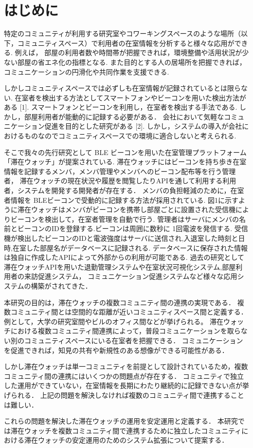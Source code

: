 \thispagestyle{myheadings}

\section{はじめに}
\label{sec:intro}
特定のコミュニティが利用する研究室やコワーキングスペースのような場所（以下，コミュニティスペース）で利用者の在室情報を分析すると様々な応用ができる.
例えば， 部屋の利用者数や時間帯が把握できれば，環境整備や活用状況が少ない部屋の省エネ化の指標となる.
また目的とする人の居場所を把握できれば，コミュニケーションの円滑化や共同作業を支援できる.

しかしコミュニティスペースでは必ずしも在室情報が記録されているとは限らない.
在室者を検出する方法としてスマートフォンやビーコンを用いた検出方法がある [1].
スマートフォンとビーコンを利用し，在室者を検出する手法である.
しかし，部屋利用者が能動的に記録する必要がある．
会社において気軽なコミュニケーション促進を目的とした研究がある [2].
しかし，システムの導入が会社におけるものなのでコミュニティスペースでの環境に適合しないと考えられる.

そこで我々の先行研究として BLE ビーコンを用いた在室管理プラットフォーム「滞在ウォッチ」が提案されている.
滞在ウォッチにはビーコンを持ち歩き在室情報を記録するメンバ，メンバ管理やメンバへのビーコン配布等を行う管理者，
滞在ウォッチの現在状況や履歴を閲覧したりAPIを通して利用する利用者，システムを開発する開発者が存在する．
メンバの負担軽減のために，在室者情報を BLEビーコンで受動的に記録する方法が採用されている.
図1に示すように滞在ウォッチはメンバがビーコンを携帯し部屋ごとに設置された受信機によりビーコンを検出して，在室者管理を自動で行う.
管理者はサーバにメンバの名前とビーコンのIDを登録する.ビーコンは周囲に数秒に 1回電波を発信する.
受信機が検出したビーコンのIDと電波強度はサーバに送信され,入退室した時刻と日時,在室した部屋名がデータベースに記録される.
データベースに保存された情報は独自に作成したAPIによって外部からの利用が可能である.
過去の研究として滞在ウォッチAPIを用いた退勤管理システムや在室状況可視化システム,部屋利用者の来訪促進システム，
コミュニケーション促進システムなど様々な応用システムの構築がされてきた．

本研究の目的は，滞在ウォッチの複数コミュニティ間の連携の実現である．
複数コミュニティ間とは空間的な距離が近いコミュニティスペース間と定義する．
例として，大学の研究室間やビルのオフィス間などが挙げられる。
滞在ウォッチにおける複数コミュニティ間連携によって，普段コミュニケーションを取らない別のコミュニティスペースにいる在室者を把握できる．
コミュニケーションを促進できれば，知見の共有や新規性のある想像ができる可能性がある．

しかし滞在ウォッチは単一コミュニティを前提として設計されているため，複数コミュニティ間の連携にはいくつかの問題点が存在する．
コミュニティで独立した運用ができていない，在室情報を長期にわたり継続的に記録できない点が挙げられる．
上記の問題を解決しなければ複数のコミュニティ間で連携することは難しい．

これらの問題を解決した滞在ウォッチの運用を安定運用と定義する．
本研究では滞在ウォッチを複数コミュニティ間で連携するために独立したコミュニティにおける滞在ウォッチの安定運用のためのシステム拡張について提案する．